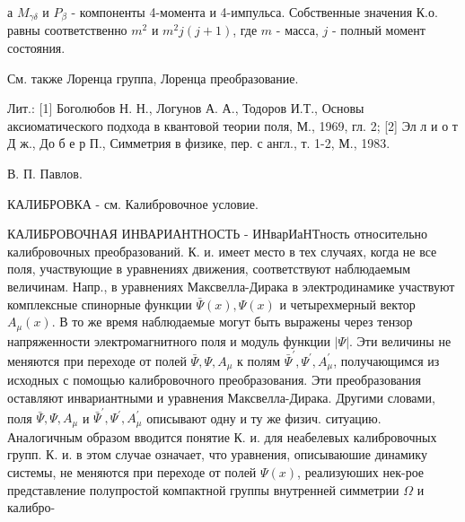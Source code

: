 \documentclass[10pt]{article}
\begin{document}
а $M_{\gamma \delta}$ и $P_{\beta}$ - компоненты 4-момента и 4-импульса. Собственные значения К.о. равны соответственно $m^{2}$ и $m^{2} j(j+1)$, где $m$ - масса, $j$ - полный момент состояния.



См. также Лоренца группа, Лоренца преобразование.



Лит.: [1] Боголюбов Н. Н., Логунов А. А., Тодоров И.Т., Основы аксиоматического подхода в квантовой теории поля, М., 1969, гл. 2; [2] Эл л и о т Д ж., До б е р П., Симметрия в физике, пер. с англ., т. 1-2, М., 1983.



В. П. Павлов.



КАЛИБРОВКА - см. Калибровочное условие.



КАЛИБРОВОЧНАЯ ИНВАРИАНТНОСТЬ - ИНварИаНТность относительно калибровочных преобразований. К. и. имеет место в тех случаях, когда не все поля, участвующие в уравнениях движения, соответствуют наблюдаемым величинам. Напр., в уравнениях Максвелла-Дирака в электродинамике участвуют комплексные спинорные функции $\bar{\Psi}(x), \Psi(x)$ и четырехмерный вектор $A_{\mu}(x)$. В то же время наблюдаемые могут быть выражены через тензор напряженности электромагнитного поля и модуль функции $|\Psi|$. Эти величины не меняются при переходе от полей $\bar{\Psi}, \Psi, A_{\mu}$ к полям $\bar{\Psi}^{\prime}, \Psi^{\prime}, A_{\mu}^{\prime}$, получающимся из исходных с помощью калибровочного преобразования. Эти преобразования оставляют инвариантными и уравнения Максвелла-Дирака. Другими словами, поля $\bar{\Psi}, \Psi, A_{\mu}$ и $\bar{\Psi}^{\prime}, \Psi^{\prime}, A_{\mu}^{\prime}$ описывают одну и ту же физич. ситуацию. Аналогичным образом вводится понятие К. и. для неабелевых калибровочных групп. К. и. в этом случае означает, что уравнения, описываюшие динамику системы, не меняются при переходе от полей $\Psi(x)$, реализуюших нек-рое представление полупростой компактной группы внутренней симметрии $\Omega$ и калибро-
\end{document}
